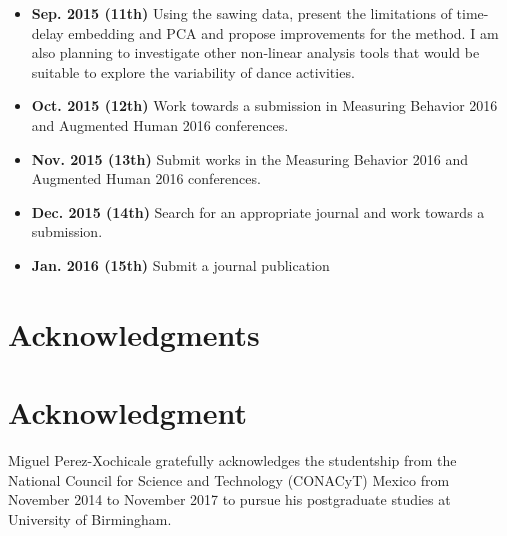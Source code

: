 \documentclass[10pt,journal,compsoc]{IEEEtran}
\begin{document}
\begin{itemize}
\item \textbf{Sep. 2015 (11th)}  Using the sawing data, present the limitations of 
    time-delay embedding and PCA and propose improvements for the method.
    I am also planning to investigate other non-linear analysis tools that would be suitable 
	to explore the variability of dance activities.
 \item \textbf{Oct. 2015 (12th)} Work towards a submission in Measuring Behavior 2016 and Augmented Human 2016 conferences.
 \item \textbf{Nov. 2015 (13th)} Submit works in the Measuring Behavior 2016 and Augmented Human 2016 conferences.
 \item \textbf{Dec. 2015 (14th)} Search for an appropriate journal and work towards a submission.
 \item \textbf{Jan. 2016 (15th)} Submit a journal publication
\end{itemize}


\ifCLASSOPTIONcompsoc
  \section*{Acknowledgments}
\else
  \section*{Acknowledgment}
\fi

Miguel Perez-Xochicale gratefully acknowledges the studentship from 
the National Council for Science and Technology (CONACyT) Mexico
from November 2014 to November 2017 to pursue his postgraduate studies 
at University of Birmingham.

\ifCLASSOPTIONcaptionsoff
  \newpage
\fi



\end{document}
